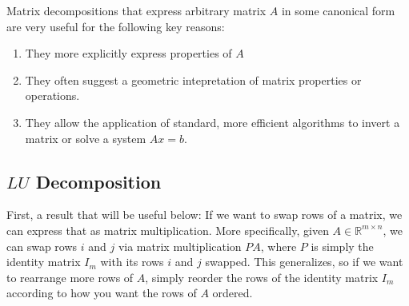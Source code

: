 \documentclass[12pt]{book}
\numberwithin{equation}{section} %
\theoremstyle{plain}
\theoremstyle{definition}
\theoremstyle{remark}
\newcommand{\R}{\mathbb{R}}
\begin{document}
Matrix decompositions that express arbitrary matrix $A$ in some
canonical form are very useful for the following key reasons:
\begin{enumerate}  \item They more explicitly express properties of $A$
  \item They often suggest a geometric intepretation of matrix
    properties or operations.
  \item They allow the application of standard, more efficient
    algorithms to invert a matrix or solve a system $Ax=b$.
\end{enumerate}


\subsection{$LU$ Decomposition}

First, a result that will be useful below: If we want to swap rows of a
matrix, we can express that as matrix multiplication. More specifically,
given $A\in\R^{m\times n}$, we can swap rows $i$ and $j$ via
matrix multiplication $PA$, where $P$ is simply the identity matrix
$I_m$ with its rows $i$ and $j$ swapped. This generalizes, so if
we want to rearrange more rows of $A$, simply reorder the rows of the
identity matrix $I_m$ according to how you want the rows of $A$ ordered.
\end{document}

